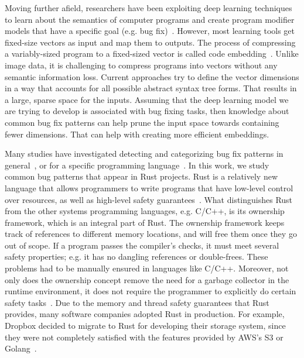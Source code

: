 Moving further afield, researchers have been exploiting deep learning techniques to learn about the semantics of computer programs and create program modifier models that have a specific goal (e.g. bug fix)~\cite{alon2019code2vec,alon2018general,raychev2016learning,bielik2016phog}. However, most learning tools get fixed-size vectors as input and map them to outputs. The process of compressing a variably-sized program to a fixed-sized vector is called code embedding~\cite{chen2019literature}. Unlike image data, it is challenging to compress programs into vectors without any semantic information loss. Current approaches try to define the vector dimensions in a way that accounts for all possible abstract syntax tree forms. That results in a large, sparse space for the inputs. Assuming that the deep learning model we are trying to develop is associated with bug fixing tasks, then knowledge about common bug fix patterns can help prune the input space towards containing fewer dimensions. That can help with creating more efficient embeddings.


Many studies have investigated detecting and categorizing bug fix patterns in general~\cite{islam2021changes,madeiral2018towards,pan2009toward}, or for a specific programming language~\cite{yang2022mining,hanam2016discovering,campos2019discovering}. In this work, we study common bug patterns that appear in Rust projects. Rust is a relatively new language that allows programmers to write programs that have low-level control over resources, as well as high-level safety guarantees~\cite{klabnik2019rust}. What distinguishes Rust from the other systems programming languages, e.g. C/C++, is its ownership framework, which is an integral part of Rust. The ownership framework keeps track of references to different memory locations, and will free them once they go out of scope. If a program passes the compiler’s checks, it must meet several safety properties; e.g. it has no dangling references or double-frees. These problems had to be manually ensured in languages like C/C++. Moreover, not only does the ownership concept remove the need for a garbage collector in the runtime environment, it does not require the programmer to explicitly do certain safety tasks~\cite{qin2020understanding}. Due to the memory and thread safety guarantees that Rust provides, many software companies adopted Rust in production. For example, Dropbox decided to migrate to Rust for developing their storage system, since they were not completely satisfied with the features provided by AWS’s S3 or Golang~\cite{dropbox}.

